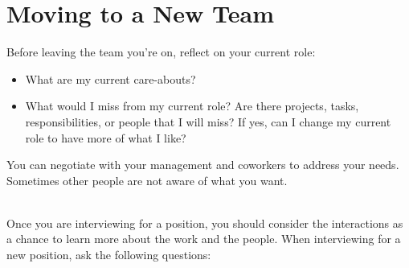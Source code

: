 
\clearpage
\section*{Moving to a New Team\label{sec:moving-to-new-team}}

Before leaving the team you're on, reflect on your current role:
\begin{itemize}
    \item What are my current care-abouts?
    \item What would I miss from my current role? Are there projects, tasks, responsibilities, or people that I will miss? If yes, can I change my current role to have more of what I like?
\end{itemize}
You can negotiate with your management and coworkers to address your needs. Sometimes other people are not aware of what you want. 

\ \\

Once you are interviewing for a position, you should consider the interactions as a chance to learn more about the work and the people. When interviewing for a new position, ask the following questions:

